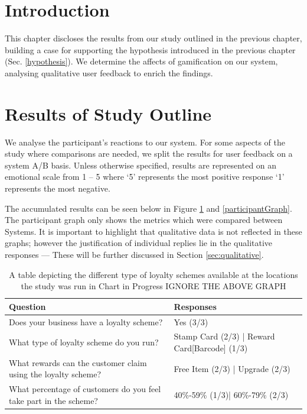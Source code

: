\section{Introduction}
This chapter discloses the results from our study outlined in the previous chapter, building a case for supporting the hypothesis introduced in the previous chapter (Sec. \ref{hypothesis}). We determine the affects of gamification on our system, analysing qualitative user feedback to enrich the findings.
\section{Results of Study Outline}
We analyse the participant's reactions to our system. For some aspects of the study where comparisons are needed, we split the results for user feedback on a  system A/B basis. Unless otherwise specified, results are represented on an emotional scale from 1 -- 5 where `5' represents the most positive response `1' represents the most negative.

The accumulated results can be seen below in Figure \ref{employeeGraph} and \ref{participantGraph}. The participant graph only shows the metrics which were compared between Systems. It is important to highlight that qualitative data is not reflected in these graphs; however the justification of individual replies lie in the qualitative responses --- These will be further discussed in Section \ref{sec:qualitative}.

\begin{table}[h]
\begin{tabular}{@{}ll@{}}
\toprule
\textbf{Question}                                                 & \textbf{Responses}                                \\ \midrule
Does your business have a loyalty scheme?                         & Yes (3/3)                                         \\
What type of loyalty scheme do you run?                           & Stamp Card (2/3) | Reward Card{[}Barcode{]} (1/3) \\
What rewards can the customer claim using the loyalty scheme?     & Free Item (2/3) | Upgrade (2/3)                   \\
What percentage of customers do you feel take part in the scheme? & 40\%-59\% (1/3)|  60\%-79\% (2/3)                 \\ \bottomrule
\end{tabular}
     \caption{A table depicting the different type of loyalty schemes available at the locations the study was run in
     			Chart in Progress IGNORE THE ABOVE GRAPH}
     \label{employeeGraph}
\end{table}



